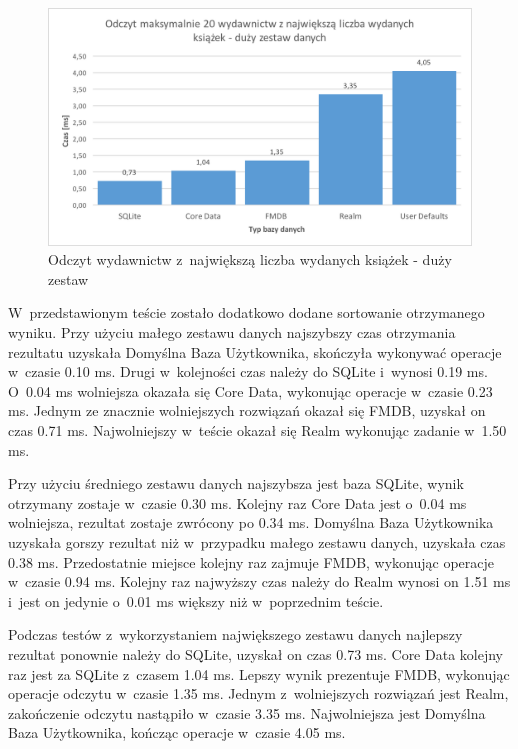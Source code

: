 \begin{figure}[H]
\centering
	\includegraphics[width=13.5cm]{img/read_data/read_by_publishers/read_by_publishers_big_test.png}
	\caption{Odczyt wydawnictw z~największą liczba wydanych książek - duży zestaw}
	\label{fig: read-by-publishers-big}
\end{figure}

 W~przedstawionym teście zostało dodatkowo dodane sortowanie otrzymanego wyniku. Przy użyciu małego zestawu danych najszybszy czas otrzymania rezultatu uzyskała Domyślna Baza Użytkownika, skończyła wykonywać operacje w~czasie 0.10 ms. Drugi w~kolejności czas należy do SQLite i~wynosi 0.19 ms. O~0.04 ms wolniejsza okazała się Core Data, wykonując operacje w~czasie 0.23 ms. Jednym ze znacznie wolniejszych rozwiązań okazał się FMDB, uzyskał on czas 0.71 ms. Najwolniejszy w~teście okazał się Realm wykonując zadanie w~1.50 ms.\par

Przy użyciu średniego zestawu danych najszybsza jest baza SQLite, wynik otrzymany zostaje w~czasie 0.30 ms. Kolejny raz Core Data jest o~0.04 ms wolniejsza, rezultat zostaje zwrócony po 0.34 ms. Domyślna Baza Użytkownika uzyskała gorszy rezultat niż w~przypadku małego zestawu danych, uzyskała czas 0.38 ms. Przedostatnie miejsce kolejny raz zajmuje FMDB, wykonując operacje w~czasie 0.94 ms. Kolejny raz najwyższy czas należy do Realm wynosi on 1.51 ms i~jest on jedynie o~0.01 ms większy niż w~poprzednim teście.\par

Podczas testów z~wykorzystaniem największego zestawu danych najlepszy rezultat ponownie należy do SQLite, uzyskał on czas 0.73 ms. Core Data kolejny raz jest za SQLite z~czasem 1.04 ms. Lepszy wynik prezentuje FMDB, wykonując operacje odczytu w~czasie 1.35 ms. Jednym z~wolniejszych rozwiązań jest Realm, zakończenie odczytu nastąpiło w~czasie 3.35 ms. Najwolniejsza jest Domyślna Baza Użytkownika, kończąc operacje w~czasie 4.05 ms. 

